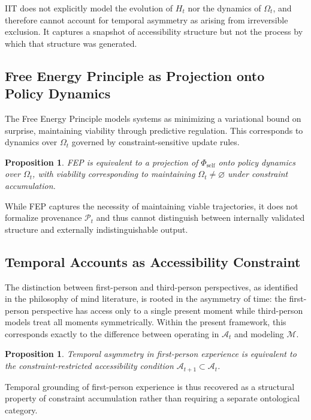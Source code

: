 \documentclass[12pt, a4paper]{article}
\theoremstyle{plain}
\newtheorem{proposition}[theorem]{Proposition}
\theoremstyle{definition}
\theoremstyle{remark}
\begin{document}
IIT does not explicitly model the evolution of $H_t$ nor the dynamics of $\Omega_t$, and therefore cannot account for temporal asymmetry as arising from irreversible exclusion. It captures a snapshot of accessibility structure but not the process by which that structure was generated.

\subsection{Free Energy Principle as Projection onto Policy Dynamics}

The Free Energy Principle models systems as minimizing a variational bound on surprise, maintaining viability through predictive regulation. This corresponds to dynamics over $\Omega_t$ governed by constraint-sensitive update rules.

\begin{proposition}
FEP is equivalent to a projection of $\Phi_{\mathrm{self}}$ onto policy dynamics over $\Omega_t$, with viability corresponding to maintaining $\Omega_t \neq \varnothing$ under constraint accumulation.
\end{proposition}

While FEP captures the necessity of maintaining viable trajectories, it does not formalize provenance $\mathcal{P}_t$ and thus cannot distinguish between internally validated structure and externally indistinguishable output.

\subsection{Temporal Accounts as Accessibility Constraint}

The distinction between first-person and third-person perspectives, as identified in the philosophy of mind literature, is rooted in the asymmetry of time: the first-person perspective has access only to a single present moment while third-person models treat all moments symmetrically. Within the present framework, this corresponds exactly to the difference between operating in $\mathcal{A}_t$ and modeling $\mathcal{M}$.

\begin{proposition}
Temporal asymmetry in first-person experience is equivalent to the constraint-restricted accessibility condition $\mathcal{A}_{t+1} \subset \mathcal{A}_t$.
\end{proposition}

Temporal grounding of first-person experience is thus recovered as a structural property of constraint accumulation rather than requiring a separate ontological category.
\end{document}
